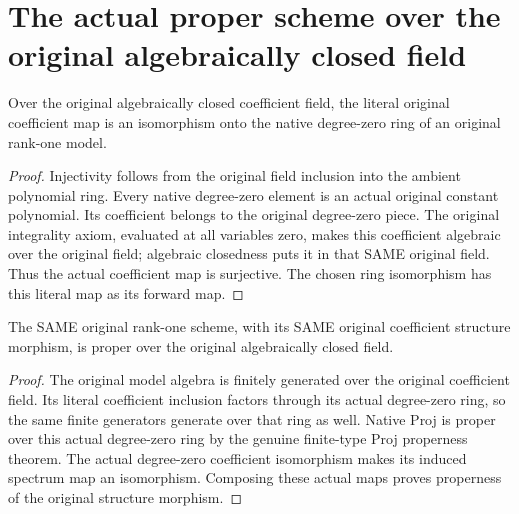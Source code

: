 \section{The actual proper scheme over the original algebraically closed field}

\begin{lemma}
\label{lem:fc-native-rank-one-degree-zero}
\leanok
{}
Over the original algebraically closed coefficient field, the literal
original coefficient map is an isomorphism onto the native degree-zero
ring of an original rank-one model.
\end{lemma}
\begin{proof}
Injectivity follows from the original field inclusion into the ambient
polynomial ring. Every native degree-zero element is an actual original
constant polynomial. Its coefficient belongs to the original degree-zero
piece. The original integrality axiom, evaluated at all variables zero,
makes this coefficient algebraic over the original field; algebraic
closedness puts it in that SAME original field. Thus the actual
coefficient map is surjective. The chosen ring isomorphism has this
literal map as its forward map.
\end{proof}

\begin{theorem}
\label{thm:fc-native-rank-one-proper}
\leanok
{}
The SAME original rank-one scheme, with its SAME original coefficient
structure morphism, is proper over the original algebraically closed
field.
\end{theorem}
\begin{proof}
The original model algebra is finitely generated over the original
coefficient field. Its literal coefficient inclusion factors through its
actual degree-zero ring, so the same finite generators generate over
that ring as well. Native Proj is proper over this actual degree-zero
ring by the genuine finite-type Proj properness theorem. The actual
degree-zero coefficient isomorphism makes its induced spectrum map an
isomorphism. Composing these actual maps proves properness of the
original structure morphism.
\end{proof}
